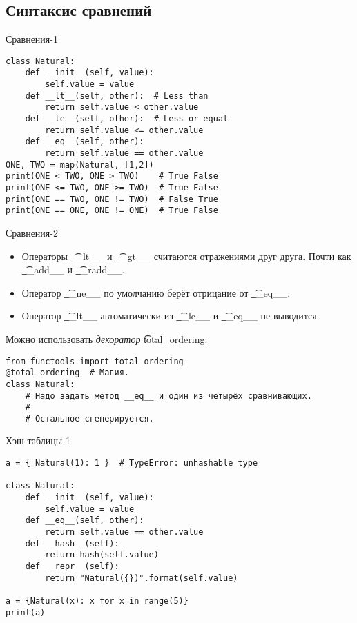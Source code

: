 \subsection{Синтаксис сравнений}
\begin{frame}
\end{frame}

\begin{frame}[fragile]{Сравнения-1}
\begin{verbatim}
class Natural:
    def __init__(self, value):
        self.value = value
    def __lt__(self, other):  # Less than
        return self.value < other.value
    def __le__(self, other):  # Less or equal
        return self.value <= other.value
    def __eq__(self, other):
        return self.value == other.value
ONE, TWO = map(Natural, [1,2])
print(ONE < TWO, ONE > TWO)    # True False
print(ONE <= TWO, ONE >= TWO)  # True False
print(ONE == TWO, ONE != TWO)  # False True
print(ONE == ONE, ONE != ONE)  # True False
\end{verbatim}
\end{frame}

\begin{frame}[fragile]{Сравнения-2}
	\begin{itemize}
		\item
			Операторы \t{\_\_lt\_\_} и \t{\_\_gt\_\_} считаются отражениями друг друга.
			Почти как \t{\_\_add\_\_} и \t{\_\_radd\_\_}.
		\item
			Оператор \t{\_\_ne\_\_} по умолчанию берёт отрицание от \t{\_\_eq\_\_}.
		\item
			Оператор \t{\_\_lt\_\_} автоматически из \t{\_\_le\_\_} и \t{\_\_eq\_\_} не выводится.
	\end{itemize}
	Можно использовать \textit{декоратор} \href{https://docs.python.org/3/library/functools.html\#functools.total\_ordering}{\t{total\_ordering}}:
\begin{verbatim}
from functools import total_ordering
@total_ordering  # Магия.
class Natural:
    # Надо задать метод __eq__ и один из четырёх сравнивающих.
    #
    # Остальное сгенерируется.
\end{verbatim}
\end{frame}

\begin{frame}[fragile]{Хэш-таблицы-1}
\begin{verbatim}
a = { Natural(1): 1 }  # TypeError: unhashable type

class Natural:
    def __init__(self, value):
        self.value = value
    def __eq__(self, other):
        return self.value == other.value
    def __hash__(self):
        return hash(self.value)
    def __repr__(self):
        return "Natural({})".format(self.value)

a = {Natural(x): x for x in range(5)}
print(a)
\end{verbatim}
\end{frame}

